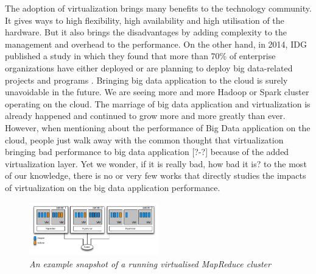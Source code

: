 \documentclass{acmsig}
\begin{document}
The adoption of virtualization brings many benefits to the technology community. It gives ways to high flexibility, high availability and high utilisation of the hardware. But it also brings the disadvantages by adding complexity to the management and overhead to the performance. On the other hand, in 2014, IDG published a study in which they found that more than 70\% of enterprise organizations have either deployed or are planning to deploy big data-related projects and programs \cite{idg}. Bringing big data application to the cloud is surely unavoidable in the future. We are seeing more and more Hadoop \cite{apachehadoop} or Spark \cite{apachespark} cluster operating on the cloud. The marriage of big data application and virtualization is already happened and continued to grow more and more greatly than ever. However, when mentioning about the performance of Big Data application on the cloud, people just walk away with the common thought that virtualization bringing bad performance to big data application [?-?] because of the added virtualization layer. Yet we wonder, if it is really bad, how bad it is? to the most of our knowledge, there is no or very few works that directly studies the impacts of virtualization on the big data application performance.

\begin{figure}[htbp]
    \centering
    \includegraphics[width=0.5\textwidth]{figures/cluster_snapshot.png}
    \caption{\textit{An example snapshot of a running virtualised MapReduce cluster}}
    \label{cluster_snapshot}
\end{figure}

\end{document}
